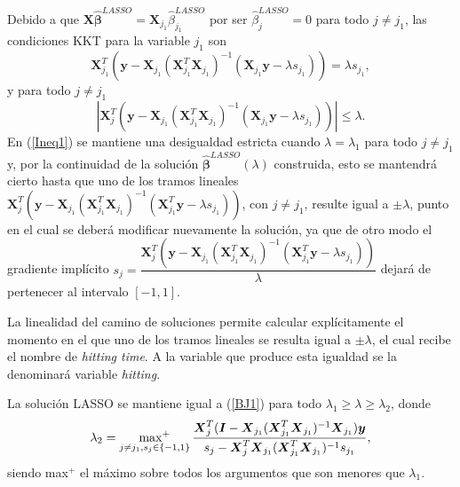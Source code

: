 \documentclass[a4paper,12pt]{report}
\begin{document}
Debido a que $\boldsymbol{X}\boldsymbol{\hat{\beta}}^{LASSO}=\boldsymbol{X}_{j_1}\hat{\beta}_{j_1}^{LASSO}$ por ser $\hat{\beta}_j^{LASSO}=0$ para todo $j \neq j_1$, las condiciones KKT para la variable $j_1$ son 
\begin{equation}
\boldsymbol{X}_{j_1}^T\left(\boldsymbol{y}-\boldsymbol{X}_{j_1}(\boldsymbol{X}_{j_1}^T\boldsymbol{X}_{j_1})^{-1}(\boldsymbol{X}_{j_1}\boldsymbol{y}-\lambda s_{j_1})\right)=\lambda s_{j_1},
\end{equation}
y para todo $j \neq j_1$
\begin{equation}
\label{Ineq1}
|\boldsymbol{X}_{j}^T\left(\boldsymbol{y}-\boldsymbol{X}_{j_1}(\boldsymbol{X}_{j_1}^T\boldsymbol{X}_{j_1})^{-1}(\boldsymbol{X}_{j_1}\boldsymbol{y}-\lambda s_{j_1})\right)| \leq \lambda.
\end{equation}
En (\ref{Ineq1}) se mantiene una desigualdad estricta cuando $\lambda=\lambda_1$ para todo $j \neq j_1$ y, por la continuidad de la solución $\boldsymbol{\hat{\beta}}^{LASSO}(\lambda)$ construida, esto se mantendrá cierto hasta que uno de los tramos lineales $\boldsymbol{X}_j^T(\boldsymbol{y}-\boldsymbol{X}_{j_1}(\boldsymbol{X}_{j_1}^T\boldsymbol{X}_{j_1})^{-1}(\boldsymbol{X}_{j_1}^T\boldsymbol{y}-\lambda s_{j_1}))$, con $j\neq j_1$, resulte igual a $\pm \lambda$, punto en el cual se deberá modificar nuevamente la solución, ya que de otro modo el gradiente implícito $s_j=\dfrac{\boldsymbol{X}_j^T(\boldsymbol{y}-\boldsymbol{X}_{j_1}(\boldsymbol{X}_{j_1}^T\boldsymbol{X}_{j_1})^{-1}(\boldsymbol{X}_{j_1}^T\boldsymbol{y}-\lambda s_{j_1}))}{\lambda}$ dejará de pertenecer al intervalo $[-1,1]$.

La linealidad del camino de soluciones permite calcular explícitamente el momento en el que uno de los tramos lineales se resulta igual a $\pm\lambda$, el cual recibe el nombre de \textit{hitting time}. A la variable que produce esta igualdad se la denominará variable \textit{hitting}.

La solución LASSO se mantiene igual a (\ref{BJ1}) para todo $\lambda_1 \geq \lambda \geq \lambda_2$, donde
\begin{equation}
\label{MaxLamb2}
\lambda_2=\operatornamewithlimits{max^+}\limits_{j\neq j_1, s_j \in \{-1,1\}} \frac{\boldsymbol{X}_j^T(\boldsymbol{I}-\boldsymbol{X}_{j_1}(\boldsymbol{X}_{j_1}^T\boldsymbol{X}_{j_1})^{-1}\boldsymbol{X}_{j_1})\boldsymbol{y}}{s_j-\boldsymbol{X}_j^T\boldsymbol{X}_{j_1}(\boldsymbol{X}_{j_1}^T\boldsymbol{X}_{j_1})^{-1}s_{j_1}},
\end{equation}
siendo max$^+$ el máximo sobre todos los argumentos que son menores que $\lambda_1$.
\end{document}
